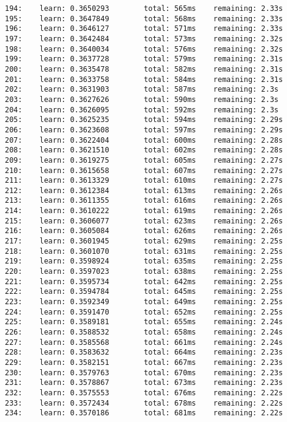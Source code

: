\documentclass[11pt]{article}
\begin{document}
\begin{Verbatim}[commandchars=\\\{\}]
194:    learn: 0.3650293        total: 565ms    remaining: 2.33s
195:    learn: 0.3647849        total: 568ms    remaining: 2.33s
196:    learn: 0.3646127        total: 571ms    remaining: 2.33s
197:    learn: 0.3642484        total: 573ms    remaining: 2.32s
198:    learn: 0.3640034        total: 576ms    remaining: 2.32s
199:    learn: 0.3637728        total: 579ms    remaining: 2.31s
200:    learn: 0.3635478        total: 582ms    remaining: 2.31s
201:    learn: 0.3633758        total: 584ms    remaining: 2.31s
202:    learn: 0.3631903        total: 587ms    remaining: 2.3s
203:    learn: 0.3627626        total: 590ms    remaining: 2.3s
204:    learn: 0.3626095        total: 592ms    remaining: 2.3s
205:    learn: 0.3625235        total: 594ms    remaining: 2.29s
206:    learn: 0.3623608        total: 597ms    remaining: 2.29s
207:    learn: 0.3622404        total: 600ms    remaining: 2.28s
208:    learn: 0.3621510        total: 602ms    remaining: 2.28s
209:    learn: 0.3619275        total: 605ms    remaining: 2.27s
210:    learn: 0.3615658        total: 607ms    remaining: 2.27s
211:    learn: 0.3613329        total: 610ms    remaining: 2.27s
212:    learn: 0.3612384        total: 613ms    remaining: 2.26s
213:    learn: 0.3611355        total: 616ms    remaining: 2.26s
214:    learn: 0.3610222        total: 619ms    remaining: 2.26s
215:    learn: 0.3606077        total: 623ms    remaining: 2.26s
216:    learn: 0.3605084        total: 626ms    remaining: 2.26s
217:    learn: 0.3601945        total: 629ms    remaining: 2.25s
218:    learn: 0.3601070        total: 631ms    remaining: 2.25s
219:    learn: 0.3598924        total: 635ms    remaining: 2.25s
220:    learn: 0.3597023        total: 638ms    remaining: 2.25s
221:    learn: 0.3595734        total: 642ms    remaining: 2.25s
222:    learn: 0.3594784        total: 645ms    remaining: 2.25s
223:    learn: 0.3592349        total: 649ms    remaining: 2.25s
224:    learn: 0.3591470        total: 652ms    remaining: 2.25s
225:    learn: 0.3589181        total: 655ms    remaining: 2.24s
226:    learn: 0.3588532        total: 658ms    remaining: 2.24s
227:    learn: 0.3585568        total: 661ms    remaining: 2.24s
228:    learn: 0.3583632        total: 664ms    remaining: 2.23s
229:    learn: 0.3582151        total: 667ms    remaining: 2.23s
230:    learn: 0.3579763        total: 670ms    remaining: 2.23s
231:    learn: 0.3578867        total: 673ms    remaining: 2.23s
232:    learn: 0.3575553        total: 676ms    remaining: 2.22s
233:    learn: 0.3572434        total: 678ms    remaining: 2.22s
234:    learn: 0.3570186        total: 681ms    remaining: 2.22s

\end{Verbatim}
\end{document}
